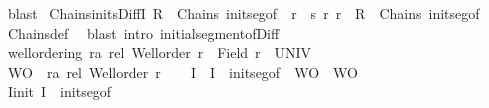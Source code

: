 \begin{isabellebody}
\ blast%
\endisatagproof
{\isafoldproof}%
%
\isadelimproof
\isanewline
%
\endisadelimproof
\isanewline
{}\isamarkupfalse%
\ Chains{\isacharunderscore}{\kern0pt}inits{\isacharunderscore}{\kern0pt}DiffI{\isacharcolon}{\kern0pt}\ {\isachardoublequoteopen}R\ {\isasymin}\ Chains\ init{\isacharunderscore}{\kern0pt}seg{\isacharunderscore}{\kern0pt}of\ {\isasymLongrightarrow}\ {\isacharbraceleft}{\kern0pt}r\ {\isacharminus}{\kern0pt}\ s\ {\isacharbar}{\kern0pt}r{\isachardot}{\kern0pt}\ r\ {\isasymin}\ R{\isacharbraceright}{\kern0pt}\ {\isasymin}\ Chains\ init{\isacharunderscore}{\kern0pt}seg{\isacharunderscore}{\kern0pt}of{\isachardoublequoteclose}\isanewline
%
\isadelimproof
\ \ %
\endisadelimproof
%
\isatagproof
{}\isamarkupfalse%
\ Chains{\isacharunderscore}{\kern0pt}def\ \isamarkupfalse%
\ {\isacharparenleft}{\kern0pt}blast\ intro{\isacharcolon}{\kern0pt}\ initial{\isacharunderscore}{\kern0pt}segment{\isacharunderscore}{\kern0pt}of{\isacharunderscore}{\kern0pt}Diff{\isacharparenright}{\kern0pt}%
\endisatagproof
{\isafoldproof}%
%
\isadelimproof
\isanewline
%
\endisadelimproof
\isanewline
{}\isamarkupfalse%
\ well{\isacharunderscore}{\kern0pt}ordering{\isacharcolon}{\kern0pt}\ {\isachardoublequoteopen}{\isasymexists}r{\isacharcolon}{\kern0pt}{\isacharcolon}{\kern0pt}{\isacharprime}{\kern0pt}a\ rel{\isachardot}{\kern0pt}\ Well{\isacharunderscore}{\kern0pt}order\ r\ {\isasymand}\ Field\ r\ {\isacharequal}{\kern0pt}\ UNIV{\isachardoublequoteclose}\isanewline
%
\isadelimproof
%
\endisadelimproof
%
\isatagproof
{}\isamarkupfalse%
\ {\isacharminus}{\kern0pt}\isanewline
%
\isanewline
\ \ \isamarkupfalse%
\ {\isacharquery}{\kern0pt}WO\ {\isacharequal}{\kern0pt}\ {\isachardoublequoteopen}{\isacharbraceleft}{\kern0pt}r{\isacharcolon}{\kern0pt}{\isacharcolon}{\kern0pt}{\isacharprime}{\kern0pt}a\ rel{\isachardot}{\kern0pt}\ Well{\isacharunderscore}{\kern0pt}order\ r{\isacharbraceright}{\kern0pt}{\isachardoublequoteclose}\isanewline
\ \ \isamarkupfalse%
\ I\ \ {\isachardoublequoteopen}I\ {\isacharequal}{\kern0pt}\ init{\isacharunderscore}{\kern0pt}seg{\isacharunderscore}{\kern0pt}of\ {\isasyminter}\ {\isacharquery}{\kern0pt}WO\ {\isasymtimes}\ {\isacharquery}{\kern0pt}WO{\isachardoublequoteclose}\isanewline
\ \ \isamarkupfalse%
\ \isamarkupfalse%
\ I{\isacharunderscore}{\kern0pt}init{\isacharcolon}{\kern0pt}\ {\isachardoublequoteopen}I\ {\isasymsubseteq}\ init{\isacharunderscore}{\kern0pt}seg{\isacharunderscore}{\kern0pt}of{\isachardoublequoteclose}\ \isamarkupfalse%

\end{isabellebody}
